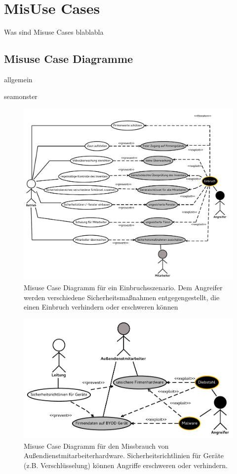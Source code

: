 \section{MisUse Cases}

Was sind Misuse Cases blablabla


\subsection{Misuse Case Diagramme}

allgemein

seamonster

\begin{figure}
\caption{Misuse Case Diagramm für ein Einbruchsszenario. Dem Angreifer werden verschiedene Sicherheitsmaßnahmen entgegengestellt, die einen Einbruch verhindern oder erschweren können}
\includegraphics[scale=0.8,angle=90]{images/MisUseCaseEinbruch.pdf} 
\end{figure}

\begin{figure}
\caption{Misuse Case Diagramm für den Missbrauch von Außendienstmitarbeiterhardware. Sicherheitsrichtlinien für Geräte (z.B. Verschlüsselung) können Angriffe erschweren oder verhindern.}
\includegraphics[scale=0.8]{images/Hardware.pdf} 
\end{figure}


